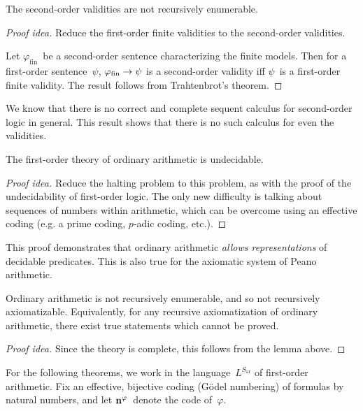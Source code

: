 \begin{thm}
The second-order validities are not recursively enumerable.
\end{thm}
\begin{proof}[Proof idea]
Reduce the first-order finite validities to the second-order validities.

Let \(\varphi_{\mathrm{fin}}\)~be a second-order sentence characterizing the finite models. Then for a first-order sentence~\(\psi\), \(\varphi_{\mathrm{fin}}\rightarrow\psi\) is a second-order validity iff \(\psi\)~is a first-order finite validity. The result follows from Trahtenbrot's theorem.
\end{proof}
\begin{app}
We know that there is no correct and complete sequent calculus for second-order logic in general. This result shows that there is no such calculus for even the validities.
\end{app}

\begin{thm}
The first-order theory of ordinary arithmetic is undecidable.
\end{thm}
\begin{proof}[Proof idea]
Reduce the halting problem to this problem, as with the proof of the undecidability of first-order logic. The only new difficulty is talking about sequences of numbers within arithmetic, which can be overcome using an effective coding (e.g. a prime coding, \(p\)-adic coding, etc.).
\end{proof}
\begin{rmk}
This proof demonstrates that ordinary arithmetic \emph{allows representations} of decidable predicates. This is also true for the axiomatic system of Peano arithmetic.
\end{rmk}

\begin{cor}
Ordinary arithmetic is not recursively enumerable, and so not recursively axiomatizable. Equivalently, for any recursive axiomatization of ordinary arithmetic, there exist true statements which cannot be proved.
\end{cor}
\begin{proof}[Proof idea]
Since the theory is complete, this follows from the lemma above.
\end{proof}

\noindent For the following theorems, we work in the language~\(L^{S_{\mathrm{ar}}}\) of first-order arithmetic. Fix an effective, bijective coding (G\"odel numbering) of formulas by natural numbers, and let \(\mathbf{{n}}^{{\varphi}}\)~denote the code of~\(\varphi\).

